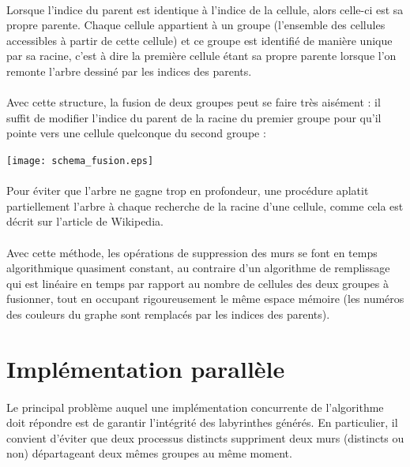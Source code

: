 \documentclass[a4paper,french]{article}
\begin{document}
    \paragraph{} Lorsque l'indice du parent est identique à l'indice de la
cellule, alors celle-ci est sa propre parente.
    \newline Chaque cellule appartient à un groupe (l'ensemble des cellules
accessibles à partir de cette cellule) et ce groupe est identifié de manière
unique par sa racine, c'est à dire la première cellule étant sa propre parente
lorsque l'on remonte l'arbre dessiné par les indices des parents.

    \paragraph{} Avec cette structure, la fusion de deux groupes peut se faire
très aisément : il suffit de modifier l'indice du parent de la racine du premier
groupe pour qu'il pointe vers une cellule quelconque du second groupe :

    \begin{center}
        \texttt{[image: schema\_fusion.eps]}
    \end{center}

    \paragraph{} Pour éviter que l'arbre ne gagne trop en profondeur, une
procédure aplatit partiellement l'arbre à chaque recherche de la racine d'une 
cellule, comme cela est décrit sur l'article de Wikipedia.

    \paragraph{} Avec cette méthode, les opérations de suppression des murs se
font en temps algorithmique quasiment constant, au contraire d'un algorithme de
remplissage qui est linéaire en temps par rapport au nombre de cellules des
deux groupes à fusionner, tout en occupant rigoureusement le même espace mémoire
(les numéros des couleurs du graphe sont remplacés par les indices des parents).

\section{Implémentation parallèle}
\label{parallelisme}

    \paragraph{} Le principal problème auquel une implémentation concurrente
de l'algorithme doit répondre est de garantir l'intégrité des labyrinthes
générés.
    \newline En particulier, il convient d'éviter que deux processus distincts
suppriment deux murs (distincts ou non) départageant deux mêmes groupes au même
moment.
\end{document}
